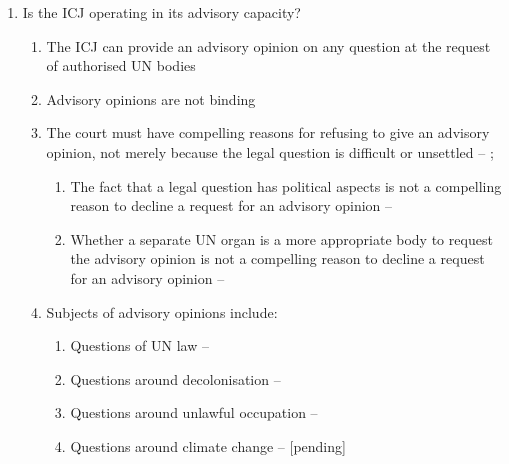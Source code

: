 \begin{enumerate}
\begin{enumerate}
\begin{enumerate}
        \end{enumerate}
    \end{enumerate}
    \item Is the ICJ operating in its advisory capacity?
    \begin{enumerate}
        \item The ICJ can provide an advisory opinion on any question at the request of authorised UN bodies
        \item Advisory opinions are not binding
        \item The court must have compelling reasons for refusing to give an advisory opinion, not merely because the legal question is difficult or unsettled -- ; 
        \begin{enumerate}
            \item The fact that a legal question has political aspects is not a compelling reason to decline a request for an advisory opinion -- 
            \item Whether a separate UN organ is a more appropriate body to request the advisory opinion is not a compelling reason to decline a request for an advisory opinion -- 
        \end{enumerate}
        \item Subjects of advisory opinions include:
        \begin{enumerate}
            \item Questions of UN law -- 
            \item Questions around decolonisation -- 
            \item Questions around unlawful occupation -- 
            \item Questions around climate change --  [pending]
        \end{enumerate}
    \end{enumerate}
\end{enumerate}